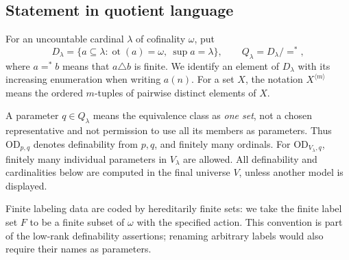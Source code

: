 \documentclass[11pt,letterpaper]{article}
\theoremstyle{definition}
\numberwithin{equation}{section}
\newcommand{\OD}{\mathrm{OD}}
\newcommand{\ot}{\operatorname{ot}}
\newcommand{\ttuple}[2]{{#1}^{\langle #2\rangle}}
\begin{document}
\subsection{Statement in quotient language}

For an uncountable cardinal $\lambda$ of cofinality $\omega$, put
\[
 D_\lambda=\{a\subseteq\lambda:\ot(a)=\omega,
                          \ \sup a=\lambda\},
 \qquad Q_\lambda=D_\lambda/{=^*},
\]
where $a=^*b$ means that $a\triangle b$ is finite. We identify an element of
$D_\lambda$ with its increasing enumeration when writing $a(n)$. For a set
$X$, the notation $\ttuple{X}{m}$ means the ordered $m$-tuples of pairwise
distinct elements of $X$.

A parameter $q\in Q_\lambda$ means the equivalence class as \emph{one set},
not a chosen representative and not permission to use all its members as
parameters. Thus $\OD_{p,q}$ denotes definability from $p,q$, and finitely many
ordinals. For $\OD_{V_\lambda,q}$, finitely many individual parameters in
$V_\lambda$ are allowed. All definability and cardinalities below are computed
in the final universe $V$, unless another model is displayed.

Finite labeling data are coded by hereditarily finite sets: we take the
finite label set $F$ to be a finite subset of $\omega$ with the specified
action. This convention is part of the low-rank definability assertions;
renaming arbitrary labels would also require their names as parameters.
\end{document}
